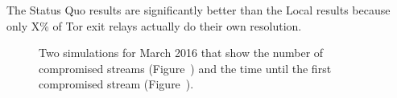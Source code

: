 The Status Quo results are significantly better than the Local results because only X\% 
of Tor exit relays actually do their own resolution.

\begin{figure}[t]
\centering
{}
\caption{Two simulations for March 2016 that show the number of compromised
	streams (Figure~) and the time until the
	first compromised stream (Figure~).}
\label{fig:compromise-stream-time}
\end{figure}
